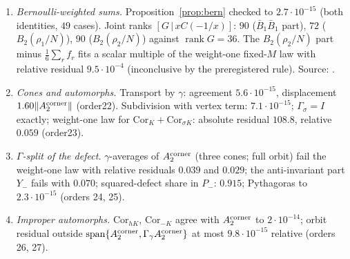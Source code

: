 \begin{enumerate}[label=D.\arabic*,leftmargin=3em]
and $7.8\cdot10^{-15}$ (order18). The affine law with $c=0$ fails on $x\in(0,3]$ with absolute residual $54.4$; the parts of $A_2^{\rm corner}$ fail every tested law, the
smallest relative residual being $3.1\cdot10^{-3}$ for the $B_2(\rho_2/N)$ part at $w=1$ (order19).
\item\label{catB:o20} \emph{Bernoulli-weighted sums.} Proposition~\ref{prop:bern} checked to $2.7\cdot10^{-15}$ (both identities, $49$ cases). Joint ranks
$[G\,|\,xC(-1/x)]$: $90$ ($\bar B_1\bar B_1$ part), $72$ ($B_2(\rho_1/N)$), $90$ ($B_2(\rho_2/N)$) against $\operatorname{rank}G=36$. The $B_2(\rho_2/N)$ part minus $\frac16\sum_rf_r$ fits a
scalar multiple of the weight-one fixed-$M$ law with relative residual $9.5\cdot10^{-4}$ (inconclusive by the preregistered rule). Source: .
\item\label{catB:o23} \emph{Cones and automorphs.} Transport by $\gamma$: agreement $5.6\cdot10^{-15}$, displacement $1.60\|A_2^{\rm corner}\|$ (order22). Subdivision with vertex term:
$7.1\cdot10^{-15}$; $\Gamma_\sigma=I$ exactly; weight-one law for $\mathrm{Cor}_K+\mathrm{Cor}_{\sigma K}$: absolute residual $108.8$, relative $0.059$ (order23).
\item\label{catB:o25} \emph{$\Gamma$-split of the defect.} $\gamma$-averages of $A_2^{\rm corner}$ (three cones; full orbit) fail the weight-one law with relative residuals $0.039$ and $0.029$; the
anti-invariant part $Y_-$ fails with $0.070$; squared-defect share in $P_-$: $0.915$; Pythagoras to $2.3\cdot10^{-15}$ (orders 24, 25).
\item\label{catB:o27} \emph{Improper automorphs.} $\mathrm{Cor}_{hK}$, $\mathrm{Cor}_{-K}$ agree with $A_2^{\rm corner}$ to $2\cdot10^{-14}$; orbit residual outside $\mathrm{span}\{A_2^{\rm corner},\Gamma_\gamma A_2^{\rm corner}\}$ at most $9.8\cdot10^{-15}$ relative (orders 26, 27).
\end{enumerate}
